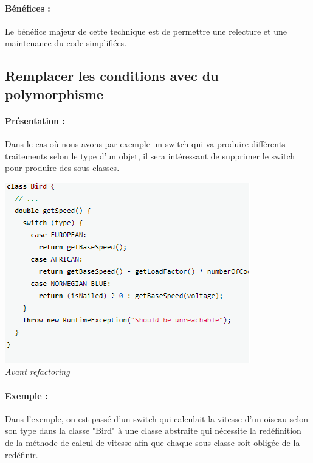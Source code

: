 \documentclass[a4paper,twoside,12pt,openright]{report}
\begin{document}
\paragraph{Bénéfices :}
Le bénéfice majeur de cette technique est de permettre une relecture et une maintenance du code simplifiées.\\

\subsection{Remplacer les conditions avec du polymorphisme}
\paragraph{Présentation :}
Dans le cas où nous avons par exemple un switch qui va produire différents traitements selon le type d'un objet, il sera intéressant de supprimer le switch pour produire des sous classes.

\begin{center}
\includegraphics[scale=1]{Image/ReplaceConditionalPoly.png}\\
\itshape{Avant refactoring \cite{ref5}}
\end{center}

\paragraph{Exemple :}
Dans l'exemple, on est passé d'un switch qui calculait la vitesse d'un oiseau selon son type dans la classe "Bird" à une classe abstraite qui nécessite la redéfinition de la méthode de calcul de vitesse afin que chaque sous-classe soit obligée de la redéfinir.
\end{document}
